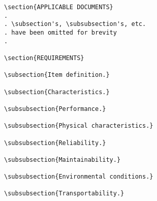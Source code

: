 \begin{itemize}
\begin{small}
\begin{verbatim}
\section{APPLICABLE DOCUMENTS}
.
. \subsection's, \subsubsection's, etc. 
. have been omitted for brevity
.  

\section{REQUIREMENTS}

\subsection{Item definition.}

\subsection{Characteristics.}

\subsubsection{Performance.}

\subsubsection{Physical characteristics.}

\subsubsection{Reliability.}

\subsubsection{Maintainability.}

\subsubsection{Environmental conditions.}

\subsubsection{Transportability.}


\end{verbatim}
\end{small}
\end{itemize}
